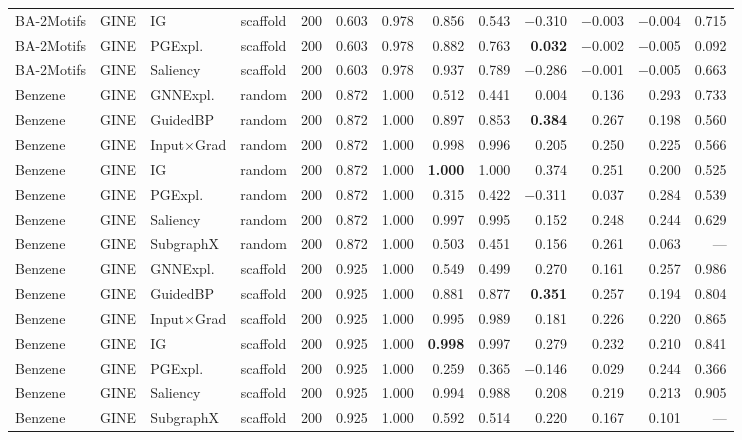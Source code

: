 \begin{table}[t]
{\begin{tabular}{lllcrrrrrrrrr}
BA-2Motifs & GINE & IG & scaffold & 200 & 0.603 & 0.978 & 0.856 & 0.543 & $-$0.310 & $-$0.003 & $-$0.004 & 0.715 \\
BA-2Motifs & GINE & PGExpl. & scaffold & 200 & 0.603 & 0.978 & 0.882 & 0.763 & \textbf{0.032} & $-$0.002 & $-$0.005 & 0.092 \\
BA-2Motifs & GINE & Saliency & scaffold & 200 & 0.603 & 0.978 & 0.937 & 0.789 & $-$0.286 & $-$0.001 & $-$0.005 & 0.663 \\
\addlinespace[2pt]
Benzene & GINE & GNNExpl. & random & 200 & 0.872 & 1.000 & 0.512 & 0.441 & 0.004 & 0.136 & 0.293 & 0.733 \\
Benzene & GINE & GuidedBP & random & 200 & 0.872 & 1.000 & 0.897 & 0.853 & \textbf{0.384} & 0.267 & 0.198 & 0.560 \\
Benzene & GINE & Input$\times$Grad & random & 200 & 0.872 & 1.000 & 0.998 & 0.996 & 0.205 & 0.250 & 0.225 & 0.566 \\
Benzene & GINE & IG & random & 200 & 0.872 & 1.000 & \textbf{1.000} & 1.000 & 0.374 & 0.251 & 0.200 & 0.525 \\
Benzene & GINE & PGExpl. & random & 200 & 0.872 & 1.000 & 0.315 & 0.422 & $-$0.311 & 0.037 & 0.284 & 0.539 \\
Benzene & GINE & Saliency & random & 200 & 0.872 & 1.000 & 0.997 & 0.995 & 0.152 & 0.248 & 0.244 & 0.629 \\
Benzene & GINE & SubgraphX & random & 200 & 0.872 & 1.000 & 0.503 & 0.451 & 0.156 & 0.261 & 0.063 & --- \\
\addlinespace[2pt]
Benzene & GINE & GNNExpl. & scaffold & 200 & 0.925 & 1.000 & 0.549 & 0.499 & 0.270 & 0.161 & 0.257 & 0.986 \\
Benzene & GINE & GuidedBP & scaffold & 200 & 0.925 & 1.000 & 0.881 & 0.877 & \textbf{0.351} & 0.257 & 0.194 & 0.804 \\
Benzene & GINE & Input$\times$Grad & scaffold & 200 & 0.925 & 1.000 & 0.995 & 0.989 & 0.181 & 0.226 & 0.220 & 0.865 \\
Benzene & GINE & IG & scaffold & 200 & 0.925 & 1.000 & \textbf{0.998} & 0.997 & 0.279 & 0.232 & 0.210 & 0.841 \\
Benzene & GINE & PGExpl. & scaffold & 200 & 0.925 & 1.000 & 0.259 & 0.365 & $-$0.146 & 0.029 & 0.244 & 0.366 \\
Benzene & GINE & Saliency & scaffold & 200 & 0.925 & 1.000 & 0.994 & 0.988 & 0.208 & 0.219 & 0.213 & 0.905 \\
Benzene & GINE & SubgraphX & scaffold & 200 & 0.925 & 1.000 & 0.592 & 0.514 & 0.220 & 0.167 & 0.101 & --- \\

\end{tabular}}
\end{table}
